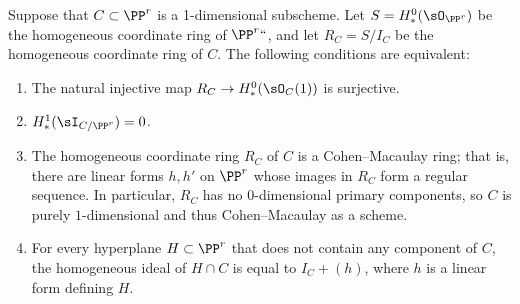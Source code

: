 \begin{proposition}\label{ACM basics}
Suppose that $C\subset \PP^r$ is a 1-dimensional subscheme. Let $S = H^0_*(\sO_{\PP^r})$
be the homogeneous coordinate ring of $\PP^r` `$, and let $R_C = S/I_C$ be the homogeneous
coordinate ring of $C$. The following conditions are equivalent:
\vadjust{\goodbreak}%
\begin{enumerate}

 \item The natural injective map $R_C \to H^0_*(\sO_{C}(1))$ is surjective.

\item $H^1_*(\sI_{C/\PP^r}) = 0$.

\item The homogeneous coordinate ring $R_C$ of $C$ is a Cohen--Macaulay ring; that is, there are linear forms $h,h'$ on $\PP^r$ whose images in  $R_C$ form a regular sequence. In particular, $R_C$ has no $0$-dimensional primary components,
so $C$ is purely $1$-dimensional and thus Cohen--Macaulay as a scheme.
%

 \item For every hyperplane $H\subset \PP^r$ that does not contain any component of $C$,
 the homogeneous ideal of $H\cap C$
 is equal to  $I_C+(h)$, where $h$ is a linear form defining $H$.
\end{enumerate}
\end{proposition}

